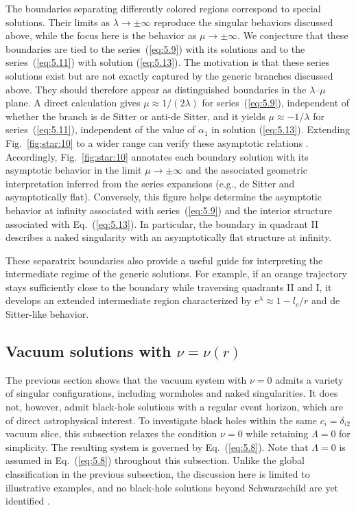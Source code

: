 \documentclass[aps,prd,twocolumn]{revtex4-2}
\begin{document}
The boundaries separating differently colored regions correspond to special solutions. Their limits as $\lambda\rightarrow\pm\infty$ reproduce the singular behaviors discussed above, while the focus here is the behavior as $\mu\rightarrow\pm\infty$. We conjecture that these boundaries are tied to the series~(\ref{eq:5.9}) with its solutions and to the series~(\ref{eq:5.11}) with solution (\ref{eq:5.13}). The motivation is that these series solutions exist but are not exactly captured by the generic branches discussed above. They should therefore appear as distinguished boundaries in the $\lambda$--$\mu$ plane. A direct calculation gives $\mu\approx1/(2\lambda)$ for series~(\ref{eq:5.9}), independent of whether the branch is de Sitter or anti-de Sitter, and it yields $\mu\approx-1/\lambda$ for series~(\ref{eq:5.11}), independent of the value of $\alpha_1$ in solution (\ref{eq:5.13}). Extending Fig.~\ref{fig:star:10} to a wider range can verify these asymptotic relations \cite{NotShown}. Accordingly, Fig.~\ref{fig:star:10} annotates each boundary solution with its asymptotic behavior in the limit $\mu\rightarrow\pm\infty$ and the associated geometric interpretation inferred from the series expansions (e.g., de Sitter and asymptotically flat). Conversely, this figure helps determine the asymptotic behavior at infinity associated with series~(\ref{eq:5.9}) and the interior structure associated with Eq.~(\ref{eq:5.13}). In particular, the boundary in quadrant II describes a naked singularity with an asymptotically flat structure at infinity.

These separatrix boundaries also provide a useful guide for interpreting the intermediate regime of the generic solutions. For example, if an orange trajectory stays sufficiently close to the boundary while traversing quadrants II and I, it develops an extended intermediate region characterized by $e^\lambda\approx1-l_c/r$ and de Sitter-like behavior.

\subsection{Vacuum solutions with $\nu=\nu(r)$}
The previous section shows that the vacuum system with $\nu=0$ admits a variety of singular configurations, including wormholes and naked singularities. It does not, however, admit black-hole solutions with a regular event horizon, which are of direct astrophysical interest. To investigate black holes within the same $c_i=\delta_{i2}$ vacuum slice, this subsection relaxes the condition $\nu=0$ while retaining $\Lambda=0$ for simplicity. The resulting system is governed by Eq.~(\ref{eq:5.8}). Note that $\Lambda=0$ is assumed in Eq.~(\ref{eq:5.8}) throughout this subsection. Unlike the global classification in the previous subsection, the discussion here is limited to illustrative examples, and no black-hole solutions beyond Schwarzschild are yet identified \cite{NoHairCaveat}.
\end{document}
